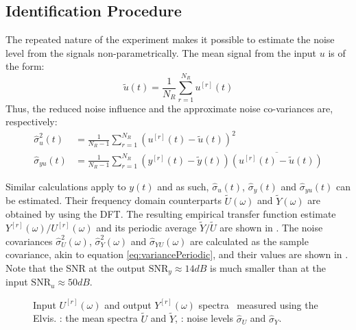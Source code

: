 \subsection{Identification Procedure}
The repeated nature of the experiment makes it possible to estimate the noise level from the signals non-parametrically.
The mean signal from the input $u$ is of the form:
\begin{equation}
  \tilde{u}(t) = \frac{1}{N_R} \sum_{r=1}^{N_R} u^{[r]}(t)
\end{equation}
Thus, the reduced noise influence and the approximate noise co-variances are, respectively:
\begin{align}
  \hat\sigma_{u}^2(t) &= \frac{1}{N_R - 1} 
                    \sum_{r=1}^{N_R} 
                    \left( u^{[r]}(t) - \tilde{u}(t) \right)^2 \\
  \hat\sigma_{yu}(t) &= \frac{1}{N_R - 1} 
                    \sum_{r=1}^{N_R} 
                    \left( y^{[r]}(t) - \tilde{y}(t) \right)
                    \overline{\left( u^{[r]}(t) - \tilde{u}(t) \right)}
  \label{eq:variancePeriodic}            
\end{align}
 
Similar calculations apply to $y(t)$ and as such, $\hat\sigma_u(t)$, $\hat\sigma_y(t)$ and $\hat\sigma_{yu}(t)$ can be estimated.
Their frequency domain counterparts $\tilde{U}(\omega)$ and $\tilde{Y}(\omega)$ are obtained by using the DFT.
The resulting empirical transfer function estimate $Y^{[r]}(\omega)/U^{[r]}(\omega)$ and its periodic average $\tilde{Y}/\tilde{U}$ are shown in .
The noise covariances $\hat\sigma^2_{U}(\omega)$, $\hat\sigma^2_{Y}(\omega)$ and  $\hat\sigma_{YU}(\omega)$ are calculated as the sample covariance, akin to equation \eqref{eq:variancePeriodic}, and their values are shown in .
Note that the SNR at the output $\mathrm{SNR}_{y} \approx 14 \unit{dB}$ is much smaller than at the input $\mathrm{SNR}_{u} \approx 50 \unit{dB}$.

\begin{figure}
  \centering
  \setlength{\figurewidth}{0.75\columnwidth}
  \setlength{\figureheight}{0.68\figurewidth}
  
  \caption[Measured input/output spectra of \BK{} filter.]{Input $U^{[r]}(\omega)$ and output $Y^{[r]}(\omega)$ spectra~ measured using the Elvis.
  : the mean spectra $\tilde{U}$ and $\tilde{Y}$, : noise levels $\hat\sigma_U$ and $\hat\sigma_Y$.}
  \label{fig:SpectraMeasurement}
\end{figure}

